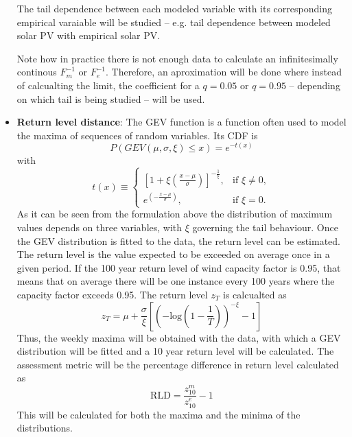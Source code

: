 \begin{itemize}
    The tail dependence between each modeled variable with its corresponding empirical varaiable will be studied -- e.g. tail dependence between modeled solar PV with empirical solar PV.  

    Note how in practice there is not enough data to calculate an infinitesimally continous $F^{-1}_m$ or $F^{-1}_e$. Therefore, an aproximation will be done where instead of calcualting the limit, the coefficient for a $q=0.05$ or $q=0.95$ -- depending on which tail is being studied -- will be used. 
    \item \textbf{Return level distance}: The GEV function is a function often used to model the maxima of sequences of random variables. Its CDF is
    \begin{equation}
        P\left(GEV\left(\mu,\sigma,\xi\right)\leq x\right)=e^{-t\left(x\right)}
    \end{equation}
    with
    \begin{equation}
        t\left(x\right)\equiv 
        \begin{cases} 
        \left[ 1 + \xi \left( \frac{x - \mu}{\sigma} \right) \right]^{- \frac{1}{\xi}}, & \text{if } \xi \neq 0, \\
        e^{\left( - \frac{x - \mu}{\sigma} \right)}, & \text{if } \xi = 0.
        \end{cases}
    \end{equation}
    As it can be seen from the formulation above the distribution of maximum values depends on three variables, with $\xi$ governing the tail behaviour. Once the GEV distribution is fitted to the data, the return level can be estimated. The return level is the value expected to be exceeded on average once in a given period. If the 100 year return level of wind capacity factor is 0.95, that means that on average there will be one instance every 100 years where the capacity factor exceeds 0.95. The return level $z_T$ is calcualted as 
    \begin{equation}
        z_T=\mu+\frac{\sigma}{\xi}\left[\left(-\text{log}\left(1-\frac{1}{T}\right)\right)^{-\xi}-1\right]
    \end{equation}
    Thus, the weekly maxima will be obtained with the data, with which a GEV distribution will be fitted and a 10 year return level will be calculated. The assessment metric will be the percentage difference in return level calculated as 
    \begin{equation}
        \text{RLD}=\frac{z^m_{10}}{z^e_{10}}-1
    \end{equation}
    This will be calculated for both the maxima and the minima of the distributions. 
\end{itemize}

